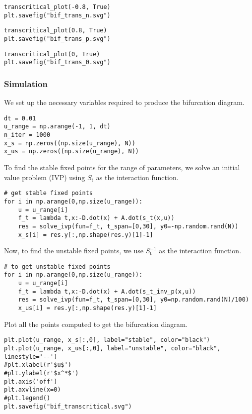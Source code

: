 \begin{verbatim}
transcritical_plot(-0.8, True)
plt.savefig("bif_trans_n.svg")
\end{verbatim}

\begin{verbatim}
transcritical_plot(0.8, True)
plt.savefig("bif_trans_p.svg")
\end{verbatim}

\begin{verbatim}
transcritical_plot(0, True)
plt.savefig("bif_trans_0.svg")
\end{verbatim}

\hypertarget{simulation}{%
\subsubsection{Simulation}\label{simulation}}

We set up the necessary variables required to produce the bifurcation
diagram.

\begin{verbatim}
dt = 0.01
u_range = np.arange(-1, 1, dt)
n_iter = 1000
x_s = np.zeros((np.size(u_range), N))
x_us = np.zeros((np.size(u_range), N))
\end{verbatim}

To find the stable fixed points for the range of parameters, we solve an
initial value problem (IVP) using \(S_\mathrm{t}\) as the interaction
function.

\begin{verbatim}
# get stable fixed points
for i in np.arange(0,np.size(u_range)):
    u = u_range[i]
    f_t = lambda t,x:-D.dot(x) + A.dot(s_t(x,u))
    res = solve_ivp(fun=f_t, t_span=[0,30], y0=-np.random.rand(N))
    x_s[i] = res.y[:,np.shape(res.y)[1]-1]
\end{verbatim}

Now, to find the unstable fixed points, we use \(S_\mathrm{t}^{-1}\) as
the interaction function.

\begin{verbatim}
# to get unstable fixed points
for i in np.arange(0,np.size(u_range)):
    u = u_range[i]
    f_t = lambda t,x:-D.dot(x) + A.dot(s_t_inv_p(x,u))
    res = solve_ivp(fun=f_t, t_span=[0,30], y0=np.random.rand(N)/100)
    x_us[i] = res.y[:,np.shape(res.y)[1]-1]
\end{verbatim}

Plot all the points computed to get the bifurcation diagram.

\begin{verbatim}
plt.plot(u_range, x_s[:,0], label="stable", color="black")
plt.plot(u_range, x_us[:,0], label="unstable", color="black", linestyle='--')
#plt.xlabel(r'$u$')
#plt.ylabel(r'$x^*$')
plt.axis('off')
plt.axvline(x=0)
#plt.legend()
plt.savefig("bif_transcritical.svg")
\end{verbatim}

